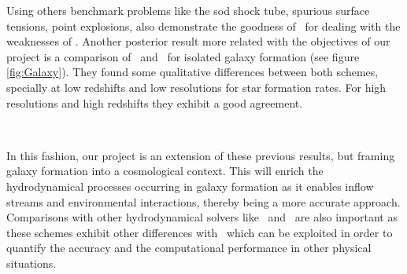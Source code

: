 \documentclass[a4,useAMS,usenatbib,usegraphicx,12pt]{article}
\begin{document}
Using others benchmark problems like the sod shock tube, spurious surface
tensions, point explosions, \citet{Hess10} also demonstrate the goodness
of \VPH\ for dealing with the weaknesses of \SPH. Another posterior result
more related with the objectives of our project is a comparison of \VPH\ and
\SPH\ for isolated galaxy formation \citep{Hess12} (see figure 
\ref{fig:Galaxy}). They found some qualitative differences between both
schemes, specially at low redshifts and low resolutions for star formation 
rates. For high resolutions and high redshifts they exhibit a good 
agreement.

\

In this fashion, our project is an extension of these previous results, 
but framing galaxy formation into a cosmological context. This will enrich
the hydrodynamical processes occurring in galaxy formation as it enables 
inflow streams and environmental interactions, thereby being a more 
accurate approach. Comparisons with other hydrodynamical solvers like 
\AMR\ and \AREPO\ are also important as these schemes exhibit other 
differences with \VPH\ which can be exploited in order to quantify the
accuracy and the computational performance in other physical situations.
\end{document}
